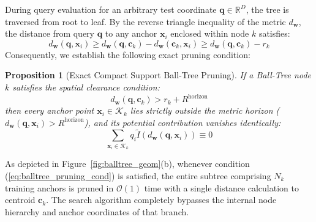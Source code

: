 \documentclass[times, review, 10pt]{elsarticle}
\newtheorem{proposition}{Proposition}
\begin{document}
During query evaluation for an arbitrary test coordinate $\mathbf{q} \in \mathbb{R}^D$, the tree is traversed from root to leaf. By the reverse triangle inequality of the metric $d_{\mathbf{w}}$, the distance from query $\mathbf{q}$ to any anchor $\mathbf{x}_i$ enclosed within node $k$ satisfies:
\begin{equation}
d_{\mathbf{w}}(\mathbf{q}, \mathbf{x}_i) \ge d_{\mathbf{w}}(\mathbf{q}, \mathbf{c}_k) - d_{\mathbf{w}}(\mathbf{c}_k, \mathbf{x}_i) \ge d_{\mathbf{w}}(\mathbf{q}, \mathbf{c}_k) - r_k
\end{equation}
Consequently, we establish the following exact pruning condition:
\begin{proposition}[Exact Compact Support Ball-Tree Pruning]
If a Ball-Tree node $k$ satisfies the spatial clearance condition:
\begin{equation}
d_{\mathbf{w}}(\mathbf{q}, \mathbf{c}_k) > r_k + R^{\mathrm{horizon}}
\label{eq:balltree_pruning_cond}
\end{equation}
then every anchor point $\mathbf{x}_i \in \mathcal{K}_k$ lies strictly outside the metric horizon ($d_{\mathbf{w}}(\mathbf{q}, \mathbf{x}_i) > R^{\mathrm{horizon}}$), and its potential contribution vanishes identically:
\begin{equation}
\sum_{\mathbf{x}_i \in \mathcal{K}_k} q_i \tilde{I}(d_{\mathbf{w}}(\mathbf{q}, \mathbf{x}_i)) \equiv 0
\end{equation}
\end{proposition}
As depicted in Figure~\ref{fig:balltree_geom}(b), whenever condition (\ref{eq:balltree_pruning_cond}) is satisfied, the entire subtree comprising $N_k$ training anchors is pruned in $\mathcal{O}(1)$ time with a single distance calculation to centroid $\mathbf{c}_k$. The search algorithm completely bypasses the internal node hierarchy and anchor coordinates of that branch.
\end{document}
